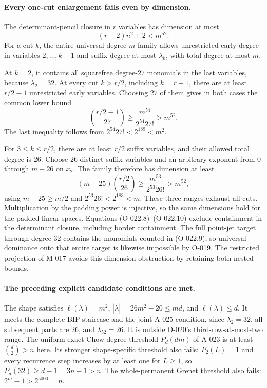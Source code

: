 \paragraph{Every one-cut enlargement fails even by dimension.}
The determinant-pencil closure in $r$ variables has
dimension at most
\[
                      (r-2)n^2+2<m^{52}.
                                                               \tag{O-022.8}
\]
For a cut $k$, the entire universal degree-$m$ family
allows unrestricted early degree in variables
$2,\ldots,k-1$ and suffix degree at most $\lambda_k$,
with total degree at most $m$.

At $k=2$, it contains all squarefree degree-$27$
monomials in the last variables, because $\lambda_2=32$.
At every cut $k>r/2$, including $k=r+1$, there are at
least $r/2-1$ unrestricted early variables. Choosing
$27$ of them gives in both cases the common lower bound
\[
     \binom{r/2-1}{27}
          \geq\frac{m^{54}}{2^{54}27!}>m^{52}.
                                                               \tag{O-022.9}
\]
The last inequality follows from
$2^{54}27!<2^{189}<m^2$.

For $3\leq k\leq r/2$, there are at least $r/2$
suffix variables, and their allowed total degree is
$26$. Choose $26$ distinct suffix variables and an
arbitrary exponent from $0$ through $m-26$ on $x_2$.
The family therefore has dimension at least
\[
 (m-25)\binom{r/2}{26}
           \geq\frac{m^{53}}{2^{53}26!}>m^{52},
                                                               \tag{O-022.10}
\]
using $m-25\geq m/2$ and
$2^{53}26!<2^{183}<m$.
These three ranges exhaust all cuts. Multiplication by
the padding power is injective, so the same dimensions
hold for the padded linear spaces. Equations
(O-022.8)--(O-022.10) exclude containment in the
determinant closure, including border containment.
The full point-jet target through degree $32$ contains
the monomials counted in (O-022.9), so universal dominance
onto that entire target is likewise impossible by O-019.
The restricted projection of M-017 avoids this dimension
obstruction by retaining both nested bounds.

\paragraph{The preceding explicit candidate conditions are met.}
The shape satisfies $\ell(\lambda)=m^2$,
$|\bar\lambda|=26m^2-20\leq md$, and
$\ell(\lambda)\leq d$. It meets the complete BIP
staircase and the joint A-025 condition, since
$\lambda_2=32$, all subsequent parts are $26$, and
$\lambda_{52}=26$. It is outside O-020's
third-row-at-most-two range.
The uniform exact Chow degree threshold $P_d(dm)$ of
A-023 is at least $\binom d2>n$ here.
Its stronger shape-specific threshold also fails:
$P_2(L)=1$ and every recurrence step increases by at
least one for $L\geq1$, so
$P_d(32)\geq d-1=3n-1>n$.
The whole-permanent Grenet threshold also fails:
$2^m-1>2^{5000}=n$.

